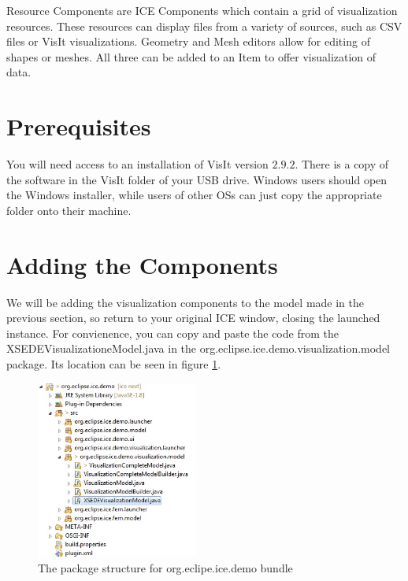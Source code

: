 Resource Components are ICE Components which contain a grid of visualization
resources. These resources can display files from a variety of sources,
such as CSV files or VisIt visualizations. Geometry and Mesh editors allow for
editing of shapes or meshes. All three can be added to an Item to offer
visualization of data.

\section{Prerequisites}

You will need access to an installation of VisIt version $2.9.2$. There is a copy of the
software in the VisIt folder of your USB drive. Windows users should open the Windows installer, while users of
other OSs can just copy the appropriate folder onto their machine.

\section{Adding the Components}

We will be adding the visualization components to the model made in the
previous section, so return to your original ICE window, closing the launched
instance. For convienence, you can copy and paste the code from the
XSEDEVisualizationeModel.java in the org.eclipse.ice.demo.visualization.model
package. Its location can be seen in figure \ref{fig:demostructure}.

\begin{figure}[!h]
\includegraphics[width=200]{images/XSEDEDemoPackageStructure}
\centering
\caption{The package structure for org.eclipe.ice.demo bundle}
\label{fig:demostructure}
\end{figure}

